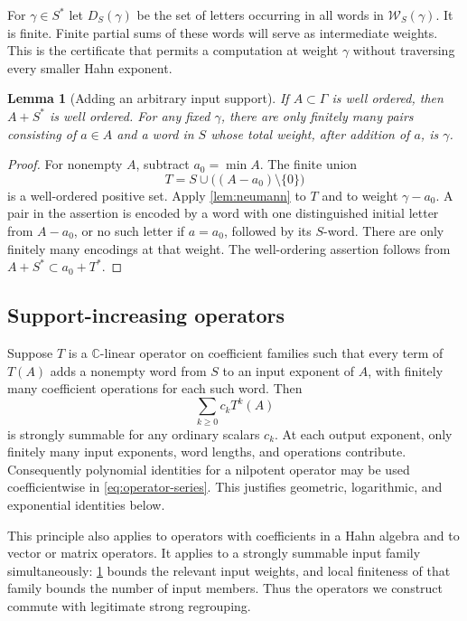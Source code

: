 \documentclass[11pt,letterpaper]{article}
\newtheorem{lemma}[lemma]{Lemma}
\theoremstyle{definition}
\theoremstyle{remark}
\newcommand{\C}{\mathbb C}
\newcommand{\word}{\mathcal W}
\numberwithin{equation}{section}
\begin{document}
For $\gamma\in S^*$ let $D_S(\gamma)$ be the set of letters occurring in
all words in $\word_S(\gamma)$. It is finite. Finite partial sums of these
words will serve as intermediate weights. This is the certificate that
permits a computation at weight $\gamma$ without traversing every smaller
Hahn exponent.

\begin{lemma}[Adding an arbitrary input support]\label{lem:shifted}
If $A\subset\Gamma$ is well ordered, then $A+S^*$ is well ordered. For any
fixed $\gamma$, there are only finitely many pairs consisting of $a\in A$
and a word in $S$ whose total weight, after addition of $a$, is $\gamma$.
\end{lemma}
\begin{proof}
For nonempty $A$, subtract $a_0=\min A$. The finite union
\[
 T=S\cup\bigl((A-a_0)\setminus\{0\}\bigr)
\]
is a well-ordered positive set. Apply \cref{lem:neumann} to $T$ and to
weight $\gamma-a_0$. A pair in the assertion is encoded by a word with one
distinguished initial letter from $A-a_0$, or no such letter if $a=a_0$,
followed by its $S$-word. There are only finitely many encodings at that
weight. The well-ordering assertion follows from $A+S^*\subset a_0+T^*$.
\end{proof}

\subsection{Support-increasing operators}
Suppose $T$ is a $\C$-linear operator on coefficient families such that every
term of $T(A)$ adds a nonempty word from $S$ to an input exponent of $A$,
with finitely many coefficient operations for each such word. Then
\begin{equation}\label{eq:operator-series}
 \sum_{k\ge0}c_kT^k(A)
\end{equation}
is strongly summable for any ordinary scalars $c_k$. At each output exponent,
only finitely many input exponents, word lengths, and operations contribute.
Consequently polynomial identities for a nilpotent operator may be used
coefficientwise in \eqref{eq:operator-series}. This justifies geometric,
logarithmic, and exponential identities below.

This principle also applies to operators with coefficients in a Hahn algebra
and to vector or matrix operators. It applies to a strongly summable input
family simultaneously: \cref{lem:shifted} bounds the relevant input weights,
and local finiteness of that family bounds the number of input members.
Thus the operators we construct commute with legitimate strong regrouping.
\end{document}
